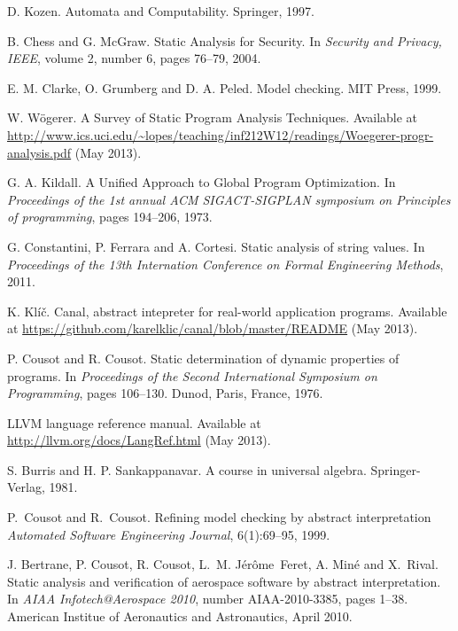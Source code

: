 \documentclass[12pt,final,oneside]{fithesis2}
\theoremstyle{definition}
\begin{document}
\begin{thebibliography}{99}
D{.} Kozen.
\newblock Automata and Computability.
\newblock Springer, 1997.

B{.} Chess and G{.} McGraw.
\newblock Static Analysis for Security.
\newblock In \emph{Security and Privacy, IEEE}, volume 2, number 6,
  pages 76--79, 2004.

E{.} M{.} Clarke, O{.} Grumberg and D{.} A{.} Peled.
\newblock Model checking.
\newblock MIT Press, 1999.

W{.} W\"{o}gerer.
\newblock A Survey of Static Program Analysis Techniques.
\newblock Available at \url{http://www.ics.uci.edu/~lopes/teaching/inf212W12/readings/Woegerer-progr-analysis.pdf}
  (May 2013).

G{.} A{.} Kildall.
\newblock A Unified Approach to Global Program Optimization.
\newblock In \emph{Proceedings of the 1st annual ACM SIGACT-SIGPLAN
  symposium on Principles of programming}, pages 194--206, 1973.

G{.} Constantini, P{.} Ferrara and A{.} Cortesi.
\newblock Static analysis of string values.
\newblock In \emph{Proceedings of the 13th Internation Conference on Formal
  Engineering Methods}, 2011.

K{.} Klíč.
\newblock Canal, abstract intepreter for real-world application programs.
\newblock Available at \url{https://github.com/karelklic/canal/blob/master/README}
  (May 2013).

P{.} Cousot and R{.} Cousot.
\newblock Static determination of dynamic properties of programs.
\newblock In {\em Proceedings of the Second International Symposium on
  Programming}, pages 106--130. Dunod, Paris, France, 1976.

\newblock LLVM language reference manual.
\newblock Available at \url{http://llvm.org/docs/LangRef.html} (May 2013).

S{.} Burris and H{.} P{.} Sankappanavar.
\newblock A course in universal algebra.
\newblock Springer-Verlag, 1981.

P.~Cousot and R.~Cousot.
\newblock Refining model checking by abstract interpretation
\newblock \emph{Automated Software Engineering Journal}, 6(1):69--95, 1999.

J. Bertrane, P. Cousot, R. Cousot, L.~M.
  J{\'e}r{\^o}me~Feret, A. Min{\'e} and X.~Rival.
\newblock Static analysis and verification of aerospace software by abstract
  interpretation.
\newblock In {\em AIAA Infotech@Aerospace 2010}, number AIAA-2010-3385, pages
  1--38. American Institue of Aeronautics and Astronautics, April 2010.


\end{thebibliography}
\end{document}
